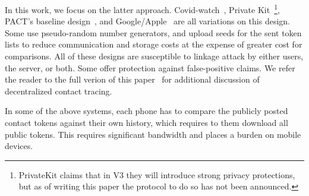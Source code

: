 \documentclass[11pt]{article} %
\begin{document}
In this work, we focus on the latter approach. Covid-watch~\cite{Covid-watch}, Private Kit~\cite{PrivateKit}\footnote{PrivateKit claims that in V3 they will introduce strong privacy protections, but as of writing this paper the protocol to do so has not been announced.}, PACT's baseline design~\cite{chan2020pact}, and Google/Apple~\cite{google-apple} are all variations on this design. Some use pseudo-random number generators, and upload seeds for the sent token lists to reduce communication and storage costs at the expense of greater cost for comparisons. All of these designs are susceptible to linkage attack by either users, the server, or both. Some offer protection against false-positive claims. We refer the reader to the full verion of this paper~\cite{epione} for additional discussion of decentralized contact tracing.

In some of the above systems, each phone has to compare the publicly posted contact tokens against their own history, which requires to them download all public tokens. This requires significant bandwidth and places a burden on mobile devices.
\end{document}
